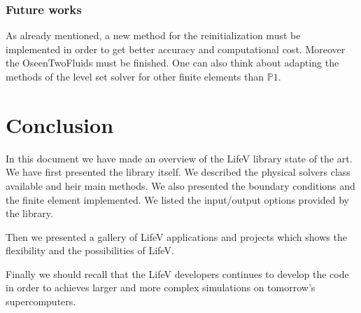 \documentclass[11pt]{article}
\begin{document}
\subsubsection{Future works}
As already mentioned, a new method for the reinitialization must be implemented in order to get better accuracy and computational cost. Moreover the OseenTwoFluids must be finished. One can also think about adapting the methods of the level set solver for other finite elements than $\mathbb{P}1$.

\section{Conclusion}
In this document we have made an overview of the LifeV library state of the art. We have first presented the library itself. We described the physical solvers class available and heir main methods. We also presented the boundary conditions and the finite element implemented. We listed the input/output options provided by the library.

Then we presented a gallery of LifeV applications and projects which shows the flexibility and the possibilities of LifeV.

Finally we should recall that the LifeV developers continues to develop the code in order to achieves larger and more complex simulations on tomorrow's supercomputers.

\newpage
\nocite{*}


\end{document}
